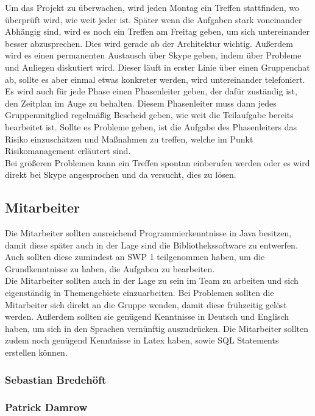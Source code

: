 \documentclass[fontsize=12pt,paper=a4,twoside]{scrartcl}
\begin{document}
Um das Projekt zu überwachen, wird jeden Montag ein Treffen stattfinden, wo überprüft wird, wie weit jeder ist. Später wenn die Aufgaben stark voneinander Abhängig sind, wird es noch ein Treffen am Freitag geben, um sich untereinander besser abzusprechen. Dies wird gerade ab der Architektur wichtig. Außerdem wird es einen permanenten Austausch über Skype geben, indem über Probleme und Anliegen diskutiert wird. Dieser läuft in erster Linie über einen Gruppenchat ab, sollte es aber einmal etwas konkreter werden, wird untereinander telefoniert. \\
Es wird auch für jede Phase einen Phasenleiter geben, der dafür zuständig ist, den Zeitplan im Auge zu behalten. Diesem Phasenleiter muss dann jedes Gruppenmitglied regelmäßig Bescheid geben, wie weit die Teilaufgabe bereits bearbeitet ist. Sollte es Probleme geben, ist die Aufgabe des Phasenleiters das Risiko einzuschätzen und Maßnahmen zu treffen, welche im Punkt Risikomanagement erläutert sind.\\
Bei größeren Problemen kann ein Treffen spontan einberufen werden oder es wird direkt bei Skype angesprochen und da versucht, dies zu lösen.

\subsection{Mitarbeiter}

Die Mitarbeiter sollten ausreichend Programmierkenntnisse in Java besitzen, damit diese später auch in der Lage sind die Bibliothekssoftware zu entwerfen. Auch sollten diese zumindest an SWP 1 teilgenommen haben, um die Grundkenntnisse zu haben, die Aufgaben zu bearbeiten. \\
Die Mitarbeiter sollten auch in der Lage zu sein im Team zu arbeiten und sich eigenständig in Themengebiete einzuarbeiten. Bei Problemen sollten die Mitarbeiter sich direkt an die Gruppe wenden, damit diese frühzeitig gelöst werden. Außerdem sollten sie genügend Kenntnisse in Deutsch und Englisch haben, um sich in den Sprachen vernünftig auszudrücken. Die Mitarbeiter sollten zudem noch genügend Kenntnisse in Latex haben, sowie SQL Statements erstellen können. 

\subsubsection{Sebastian Bredehöft}

\subsubsection{Patrick Damrow}
\end{document}
